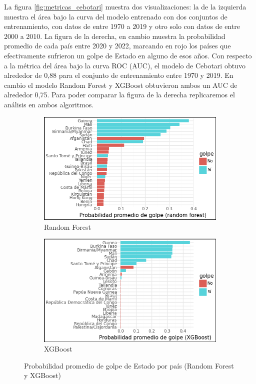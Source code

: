 \documentclass{article}
\begin{document}
La figura \ref{fig:metricas_cebotari} muestra dos visualizaciones: la de la izquierda muestra el área
bajo la curva del modelo entrenado con dos conjuntos de entrenamiento, con datos de entre 1970 a 2019
y otro solo con datos de entre 2000 a 2010. La figura de la derecha, en cambio muestra la probabilidad
promedio de cada país entre 2020 y 2022, marcando en rojo los países que efectivamente sufrieron un
golpe de Estado en alguno de esos años. Con respecto a la métrica del área bajo la curva ROC (AUC), el 
modelo de Cebotari obtuvo alrededor de 0,88 para el conjunto de entrenamiento entre 1970 y 2019. En
cambio el modelo Random Forest y XGBoost obtuvieron ambos un AUC de alrededor 0,75. Para poder comparar
la figura de la derecha replicaremos el análisis en ambos algoritmos.

\begin{figure}[htbp]
 \centering
 \begin{subfigure}[b]{0.49\textwidth}
  \includegraphics[width=\textwidth]{16_prob_rf_comp.png}
  \caption{Random Forest \label{fig:prob_rf}}
 \end{subfigure}
 \hfill
 \begin{subfigure}[b]{0.49\textwidth}
  \includegraphics[width=\textwidth]{17_prob_xgb_comp.png}
  \caption{XGBoost \label{fig:prob_xgb}}
 \end{subfigure}
 \caption{Probabilidad promedio de golpe de Estado por país (Random Forest y XGBoost) \label{fig:roc_comp}}
\end{figure}
\end{document}
